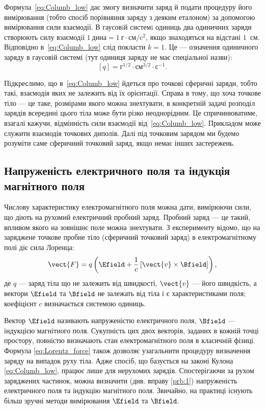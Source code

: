 Формула~\eqref{eq:Columb_low} дає змогу визначити заряд й подати процедуру його
вимірювання (тобто спосіб порівняння заряду з деяким еталоном) за
допомогою вимірювання сили взаємодії. В гаусовiй системi одиниць два
одиничних заряди створюють силу взаємодiї $1\ \text{дина} = 1\ \text{г}\cdot\text{см} / \text{c}^2$,
якщо знаходяться на відстані $1$~см. Відповідно в~\eqref{eq:Columb_low} слід покласти $k=1$. Це --- означення
одиничного заряду в гаусовій системі (тут одиниця заряду не має спеціальної назви):
\begin{equation*}
    \left[q\right] = \text{г}^{1/2}\cdot\text{см}^{3/2}\cdot\text{с}^{-1}.
\end{equation*}

Підкреслимо, що в~\eqref{eq:Columb_low} йдеться про точкові сферичні заряди, тобто
такі, взаємодія яких не залежить від їх орієнтації. Справа в тому, що хоча
точкове тіло --- це таке, розмірами якого можна знехтувати, в конкретній задачі
розподіл зарядів всередині цього тіла може бути різко неоднорідним. Це
спричинюватиме, взагалі кажучи, відмінність сили взаємодії від~\eqref{eq:Columb_low}.
Прикладом може служити взаємодія точкових диполів. Далі під точковим
зарядом ми будемо розуміти саме сферичний точковий заряд, якщо немає
інших застережень.

\subsection*{Напруженість електричного поля та індукція магнітного поля}

 Числову характеристику електромагнітного поля можна дати,
вимірюючи сили, що діють на рухомий електричний пробний заряд. Пробний
заряд --- це такий, впливом якого на зовнішнє поле можна знехтувати.
 З експерименту відомо, що на заряджене точкове пробне тіло (сферичний
точковий заряд) в електромагнітному полі діє сила Лоренца:
\begin{equation}\label{eq:Lorentz_force}
    \vect{F} = q\left( \Efield + \frac1c \left[ \vect{v}\times\Bfield\right] \right),
\end{equation}
де $q$ --- заряд тіла що не залежить від швидкості, $\vect{v}$ --- його швидкість, а вектори $\Efield$
та $\Bfield$ не залежать від тіла і є характеристиками поля; коефіцієнт $c$ визначається системою одиниць.

Вектор $\Efield$ називають напруженістю електричного поля, $\Bfield$ --- індукцією
магнітного поля. Сукупність цих двох векторів, заданих в кожній точці
простору, повністю визначають стан електромагнітного поля в класичній
фізиці. Формула \eqref{eq:Lorentz_force} також дозволяє узагальнити процедуру визначення
заряду на випадок руху тіла. Адже спосіб, що базується на законі Кулона
\eqref{eq:Columb_low}, працює лише для нерухомих зарядів.
Спостерігаючи за рухом заряджених частинок, можна визначити (див. вправу \ref{prb:1}) напруженість електричного поля та індукцію магнітного поля.
Звичайно, на практиці існують більш зручні методи вимірювання $\Efield$ та $\Bfield$.

